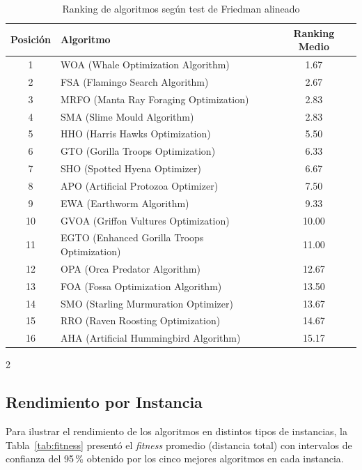 \documentclass[10pt,a4paper]{extarticle}
\begin{document}
\begin{table}[!htbp]
  \centering
  \caption{Ranking de algoritmos según test de Friedman alineado}
  \label{tab:rankings}
  \small
  \begin{tabular}{clc}
    \toprule
    \textbf{Posición} & \textbf{Algoritmo} & \textbf{Ranking Medio} \\
    \midrule
    1 & WOA (Whale Optimization Algorithm) & 1.67 \\
    2 & FSA (Flamingo Search Algorithm)    & 2.67 \\
    3 & MRFO (Manta Ray Foraging Optimization) & 2.83 \\
    4 & SMA (Slime Mould Algorithm)        & 2.83 \\
    5 & HHO (Harris Hawks Optimization)    & 5.50 \\
    6 & GTO (Gorilla Troops Optimization)  & 6.33 \\
    7 & SHO (Spotted Hyena Optimizer)      & 6.67 \\
    8 & APO (Artificial Protozoa Optimizer) & 7.50 \\
    9 & EWA (Earthworm Algorithm)          & 9.33 \\
    10 & GVOA (Griffon Vultures Optimization) & 10.00 \\
    11 & EGTO (Enhanced Gorilla Troops Optimization) & 11.00 \\
    12 & OPA (Orca Predator Algorithm)     & 12.67 \\
    13 & FOA (Fossa Optimization Algorithm) & 13.50 \\
    14 & SMO (Starling Murmuration Optimizer) & 13.67 \\
    15 & RRO (Raven Roosting Optimization) & 14.67 \\
    16 & AHA (Artificial Hummingbird Algorithm) & 15.17 \\
    \bottomrule
  \end{tabular}
\end{table}

\begin{multicols}{2}

\subsection{Rendimiento por Instancia}
Para ilustrar el rendimiento de los algoritmos en distintos tipos de instancias, la Tabla~\ref{tab:fitness} presentó el \textit{fitness} promedio (distancia total) con intervalos de confianza del 95\,\% obtenido por los cinco mejores algoritmos en cada instancia.

\end{multicols}
\end{document}
